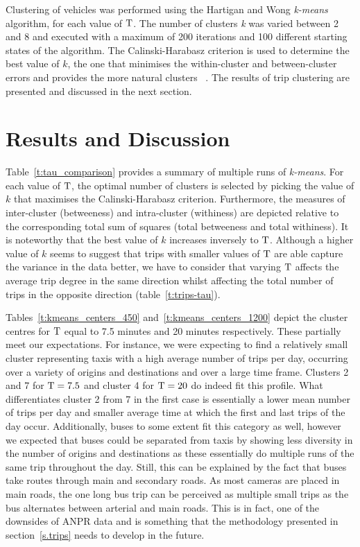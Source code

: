 Clustering of vehicles was performed using the Hartigan and Wong \emph{k-means} algorithm, for each value of $\mathrm{T}$. The number of clusters \emph{k} was varied between 2 and 8 and executed with a maximum of 200 iterations and 100 different starting states of the algorithm. The Calinski-Harabasz criterion is used to determine the best value of $k$, the one that minimises the within-cluster and between-cluster errors and provides the more natural clusters ~\cite{Kmeans}. The results of trip clustering are presented and discussed in the next section.

\section{Results and Discussion}\label{s.results}

Table~\ref{t:tau_comparison} provides a summary of multiple runs of \emph{k-means}. For each value of $\mathrm{T}$, the optimal number of clusters is selected by picking the value of $k$ that maximises the Calinski-Harabasz criterion. Furthermore, the measures of inter-cluster (betweeness) and intra-cluster (withiness) are depicted relative to the corresponding total sum of squares (total betweeness and total withiness). It is noteworthy that the best value of $k$ increases inversely to $\mathrm{T}$. Although a higher value of $k$ seems to suggest that trips with smaller values of $\mathrm{T}$ are able capture the variance in the data better, we have to consider that varying $\mathrm{T}$ affects the average trip degree in the same direction whilst affecting the total number of trips in the opposite direction (table~\ref{t:trips-tau}).

Tables~\ref{t:kmeans_centers_450} and~\ref{t:kmeans_centers_1200} depict the cluster centres for $\mathrm{T}$ equal to 7.5 minutes and 20 minutes respectively. These partially meet our expectations. For instance, we were expecting to find a relatively small cluster representing taxis with a high average number of trips per day, occurring over a variety of origins and destinations and over a large time frame. Clusters 2 and 7 for $\mathrm{T} = 7.5$ and cluster 4 for $\mathrm{T} = 20$ do indeed fit this profile. What differentiates cluster 2 from 7 in the first case is essentially a lower mean number of trips per day and smaller average time at which the first and last trips of the day occur. Additionally, buses to some extent fit this category as well, however we expected that buses could be separated from taxis by showing less diversity in the number of origins and destinations as these essentially do multiple runs of the same trip throughout the day. Still, this can be explained by the fact that buses take routes through main and secondary roads. As most cameras are placed in main roads, the one long bus trip can be perceived as multiple small trips as the bus alternates between arterial and main roads. This is in fact, one of the downsides of ANPR data and is something that the methodology presented in section~\ref{s.trips} needs to develop in the future.

